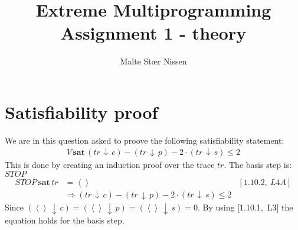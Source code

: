 \documentclass[11pt,a4paper]{article}
\title{Extreme Multiprogramming\\Assignment 1 - theory}
\author{Malte Stær Nissen}
\def\count{\,\downarrow\,}
\def\sat{\,\textbf{sat}\,}
\newcommand{\ab}[1]{\left \langle #1 \right \rangle}
\begin{document}
\maketitle

\section{Satisfiability proof}
We are in this question asked to proove the following satisfiability statement:
\begin{align*}
    V \sat (tr \count c) - (tr \count p) - 2 \cdot (tr \count s) \leq 2 
\end{align*}
This is done by creating an induction proof over the trace $tr$. The basis step
is: $STOP$
\begin{align*}
    STOP \sat tr &= \ab{ } & [1.10.2,~L4A] \\
                 & \Rightarrow (tr \count c) - (tr \count p) - 2 \cdot (tr
                 \count s) \leq 2
\end{align*}
Since $(\ab{ } \count c) = (\ab{ } \count p) = (\ab{ } \count s) = 0$. By using
[1.10.1,~L3] the equation holds for the basis step.
\end{document}
